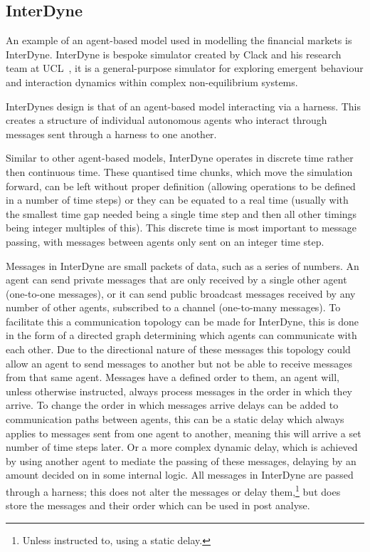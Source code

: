 \documentclass{article}
\begin{document}
\subsection{InterDyne} \label{InterDyne_section}
An example of an agent-based model used in modelling the financial markets is InterDyne. InterDyne is bespoke simulator created by Clack and his research team at UCL~\cite{Chris_webPage}, it is a general-purpose simulator for exploring emergent behaviour and interaction dynamics within complex non-equilibrium systems.

InterDyne\textsc{}s design is that of an agent-based model interacting via a harness. This creates a structure of individual autonomous agents who interact through messages sent through a harness to one another.
 
Similar to other agent-based models, InterDyne operates in discrete time rather then continuous time. These quantised time chunks, which move the simulation forward, can be left without proper definition (allowing operations to be defined in a number of time steps) or they can be equated to a real time (usually with the smallest time gap needed being a single time step and then all other timings being integer multiples of this). This discrete time is most important to message passing, with messages between agents only sent on an integer time step.

Messages in InterDyne are small packets of data, such as a series of numbers. An agent can send private messages that are only received by a single other agent (one-to-one messages), or it can send public broadcast messages received by any number of other agents, subscribed to a channel (one-to-many messages). To facilitate this a communication topology can be made for InterDyne, this is done in the form of a directed graph determining which agents can communicate with each other. Due to the directional nature of these messages this topology could allow an agent to send messages to another but not be able to receive messages from that same agent. Messages have a defined order to them, an agent will, unless otherwise instructed, always process messages in the order in which they arrive. To change the order in which messages arrive delays can be added to communication paths between agents, this can be a static delay which always applies to messages sent from one agent to another, meaning this will arrive a set number of time steps later. Or a more complex dynamic delay, which is achieved by using another agent to mediate the passing of these messages, delaying by an amount decided on in some internal logic. All messages in InterDyne are passed through a harness; this does not alter the messages or delay them,\footnote{Unless instructed to, using a static delay.} but does store the messages and their order which can be used in post analyse.
        
\end{document}
